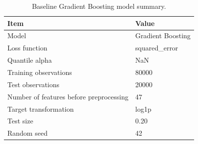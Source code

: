 \begin{table}
\caption{Baseline Gradient Boosting model summary.}
\label{tab:05-gb-model-summary}
\begin{tabular}{ll}
\toprule
Item & Value \\
\midrule
Model & Gradient Boosting \\
Loss function & squared_error \\
Quantile alpha & NaN \\
Training observations & 80000 \\
Test observations & 20000 \\
Number of features before preprocessing & 47 \\
Target transformation & log1p \\
Test size & 0.20 \\
Random seed & 42 \\
\bottomrule
\end{tabular}
\end{table}
